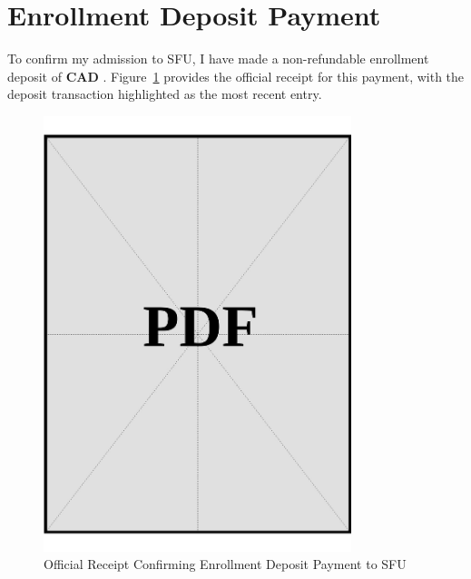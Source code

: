 \clearpage

\section{Enrollment Deposit Payment}
\label{sec:enrollment-deposit}

\noindent
To confirm my admission to SFU, I have made a non-refundable enrollment deposit of \textbf{CAD \enrollmentDeposit}. Figure~\ref{fig:enrollment-deposit} provides the official receipt for this payment, with the deposit transaction highlighted as the most recent entry.

\vspace*{\fill}

\begin{figure}[h]
    \centering
    \includegraphics[page=1, width=0.8\textwidth]{../docs/applicant/canadian-institution/deposit-payments/enrollment-receipt.pdf}
    \caption{Official Receipt Confirming Enrollment Deposit Payment to SFU}
    \label{fig:enrollment-deposit}
\end{figure}

\vspace*{\fill}
\clearpage
